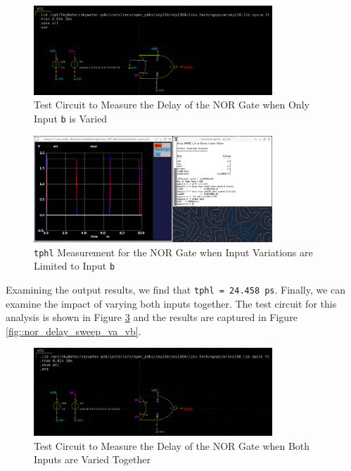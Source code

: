 \documentclass[fleqn]{article}
\begin{document}
	\begin{figure}[H]
		\centerline{\includegraphics[width=0.8\textwidth]{nor_delay_test_sweep_vb.png}}
		\caption{Test Circuit to Measure the Delay of the NOR Gate when Only Input \texttt{b} is Varied}
		\label{fig::nor_delay_test_sweep_vb}
	\end{figure}
	
	\begin{figure}[H]
		\centerline{\includegraphics[width=0.8\textwidth]{nor_delay_sweep_vb.png}}
		\caption{\texttt{tphl} Measurement for the NOR Gate when Input Variations are Limited to Input \texttt{b}}
		\label{fig::nor_delay_sweep_vb}
	\end{figure}
	
	Examining the output results, we find that \texttt{tphl = 24.458 ps}. Finally, we can examine the impact of varying both inputs together. The test circuit for this analysis is shown in Figure  \ref{fig::nor_delay_test_sweep_va_vb} and the results are captured in Figure  \ref{fig::nor_delay_sweep_va_vb}.
	
	\begin{figure}[H]
		\centerline{\includegraphics[width=0.8\textwidth]{nor_delay_test_sweep_va_vb.png}}
		\caption{Test Circuit to Measure the Delay of the NOR Gate when Both Inputs are Varied Together}
		\label{fig::nor_delay_test_sweep_va_vb}
	\end{figure}
	
\end{document}
